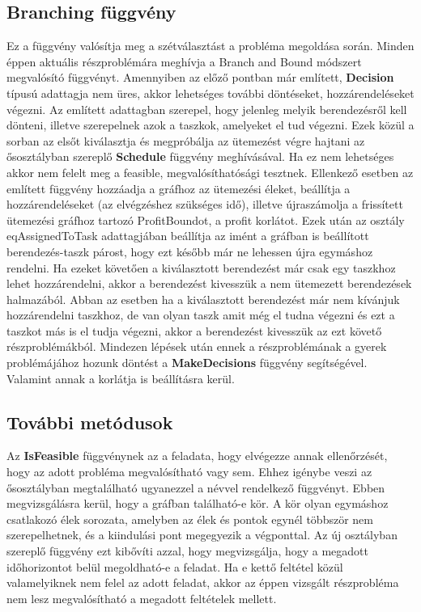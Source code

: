 \subsection{Branching függvény}
Ez a függvény valósítja meg a szétválasztást a probléma megoldása során. Minden éppen aktuális részproblémára meghívja a Branch and Bound módszert megvalósító függvényt. Amennyiben az előző pontban már említett, \textbf{Decision} típusú adattagja nem üres, akkor lehetséges további döntéseket, hozzárendeléseket végezni. Az említett adattagban szerepel, hogy jelenleg melyik berendezésről kell dönteni, illetve szerepelnek azok a taszkok, amelyeket el tud végezni. Ezek közül a sorban az elsőt kiválasztja és megpróbálja az ütemezést végre hajtani az ősosztályban szereplő \textbf{Schedule} függvény meghívásával. Ha ez nem lehetséges akkor nem felelt meg a feasible, megvalósíthatósági tesztnek. Ellenkező esetben az említett függvény hozzáadja a gráfhoz az ütemezési éleket, beállítja a hozzárendeléseket (az elvégzéshez szükséges idő), illetve újraszámolja a frissített ütemezési gráfhoz tartozó ProfitBoundot, a profit korlátot. Ezek után az osztály eqAssignedToTask adattagjában beállítja az imént a gráfban is beállított berendezés-taszk párost, hogy ezt később már ne lehessen újra egymáshoz rendelni. Ha ezeket követően a kiválasztott berendezést már csak egy taszkhoz lehet hozzárendelni, akkor a berendezést kivesszük a nem ütemezett berendezések halmazából. Abban az esetben ha a kiválasztott berendezést már nem kívánjuk hozzárendelni taszkhoz, de van olyan taszk amit még el tudna végezni és ezt a taszkot más is el tudja végezni, akkor a berendezést kivesszük az ezt követő részproblémákból. Mindezen lépések után ennek a részproblémának a gyerek problémájához hozunk döntést a \textbf{MakeDecisions} függvény segítségével. Valamint annak a korlátja is beállításra kerül.
\subsection{További metódusok}
Az \textbf{IsFeasible} függvénynek az a feladata, hogy elvégezze annak ellenőrzését, hogy az adott probléma megvalósítható vagy sem. Ehhez igénybe veszi az ősosztályban megtalálható ugyanezzel a névvel rendelkező függvényt. Ebben  megvizsgálásra kerül, hogy a gráfban található-e kör. A kör olyan egymáshoz csatlakozó élek sorozata, amelyben az élek és pontok egynél többször nem szerepelhetnek, és a kiindulási pont megegyezik a végponttal. Az új osztályban szereplő függvény ezt kibővíti azzal, hogy megvizsgálja, hogy a megadott időhorizontot belül megoldható-e a feladat. Ha e kettő feltétel közül valamelyiknek nem felel az adott feladat, akkor az éppen vizsgált részprobléma nem lesz megvalósítható a megadott feltételek mellett.

